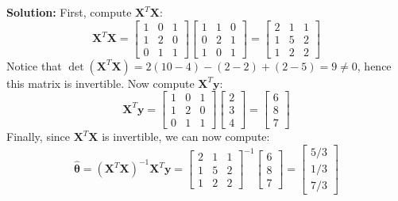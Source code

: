 \documentclass{article}
\begin{document}
\begin{enumerate}
\textbf{Solution:}
First, compute \(\mathbf{X}^T \mathbf{X}\):
\[
\mathbf{X}^T \mathbf{X} = 
\begin{bmatrix}
1 & 0 & 1 \\
1 & 2 & 0 \\
0 & 1 & 1
\end{bmatrix}
\begin{bmatrix}
1 & 1 & 0 \\
0 & 2 & 1 \\
1 & 0 & 1
\end{bmatrix}
= \begin{bmatrix}
2 & 1 & 1 \\
1 & 5 & 2 \\
1 & 2 & 2
\end{bmatrix}
\]
Notice that $\det(\mathbf{X}^T \mathbf{X})=2(10-4)-(2-2)+(2-5)=9\neq 0$, hence this matrix is invertible. Now compute \(\mathbf{X}^T \mathbf{y}\):
\[
\mathbf{X}^T \mathbf{y} = \begin{bmatrix}
1 & 0 & 1 \\
1 & 2 & 0 \\
0 & 1 & 1
\end{bmatrix}
\begin{bmatrix}
2 \\
3 \\
4
\end{bmatrix}
= \begin{bmatrix}
6 \\
8 \\
7
\end{bmatrix}
\]
Finally, since \(\mathbf{X}^T \mathbf{X}\) is invertible, we can now compute:
\[
\hat{\boldsymbol{\theta}} = (\mathbf{X}^T \mathbf{X})^{-1} \mathbf{X}^T \mathbf{y} = \begin{bmatrix}
2 & 1 & 1 \\
1 & 5 & 2 \\
1 & 2 & 2
\end{bmatrix}^{-1}
\begin{bmatrix}
6 \\
8 \\
7
\end{bmatrix} = \begin{bmatrix}
5/3 \\
1/3 \\
7/3
\end{bmatrix}
\]



\end{enumerate}
\end{document}
